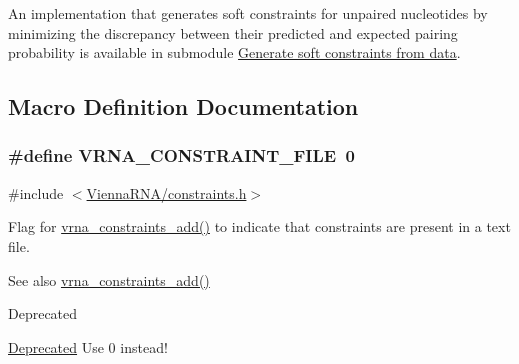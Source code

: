 An implementation that generates soft constraints for unpaired nucleotides by minimizing the discrepancy between their predicted and expected pairing probability is available in submodule \hyperlink{group__perturbation}{Generate soft constraints from data}. 

\subsection{Macro Definition Documentation}
\subsubsection[{\texorpdfstring{V\+R\+N\+A\+\_\+\+C\+O\+N\+S\+T\+R\+A\+I\+N\+T\+\_\+\+F\+I\+LE}{VRNA_CONSTRAINT_FILE}}]{\setlength{\rightskip}{0pt plus 5cm}\#define V\+R\+N\+A\+\_\+\+C\+O\+N\+S\+T\+R\+A\+I\+N\+T\+\_\+\+F\+I\+LE~0}\hypertarget{group__constraints_ga62e0ed0c33002c09423de4e646f85a2b}{}\label{group__constraints_ga62e0ed0c33002c09423de4e646f85a2b}


{\ttfamily \#include $<$\hyperlink{constraints_8h}{Vienna\+R\+N\+A/constraints.\+h}$>$}



Flag for \hyperlink{group__constraints_ga35a401f680969a556858a8dd5f1d07cc}{vrna\+\_\+constraints\+\_\+add()} to indicate that constraints are present in a text file. 

\begin{DoxySeeAlso}{See also}
\hyperlink{group__constraints_ga35a401f680969a556858a8dd5f1d07cc}{vrna\+\_\+constraints\+\_\+add()} 
\end{DoxySeeAlso}
\begin{DoxyRefDesc}{Deprecated}
\item[\hyperlink{deprecated__deprecated000039}{Deprecated}]Use 0 instead!\end{DoxyRefDesc}
